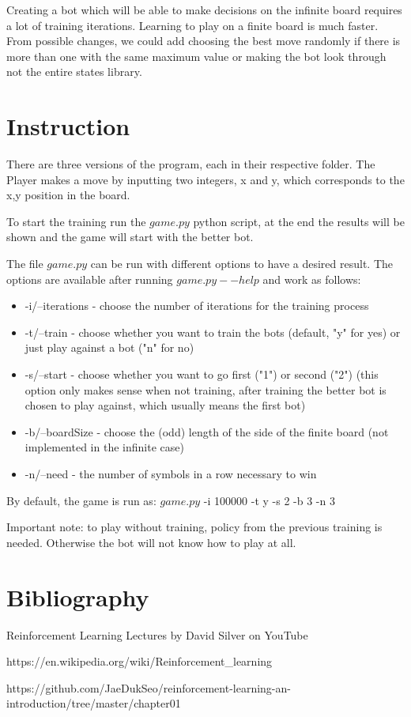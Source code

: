 \documentclass[a4paper,12pt]{book}
\begin{document}
Creating a bot which will be able to make decisions on the infinite board requires a lot of training iterations. Learning to play on a finite board is much faster. From possible changes, we could add choosing the best move randomly if there is more than one with the same maximum value or making the bot look through not the entire states library.

	\chapter{Instruction}

There are three versions of the program, each in their respective folder. The Player makes a move by inputting two integers, x and y, which corresponds to the x,y position in the board.

To start the training run the $game.py$ python script, at the end the results will be shown and the game will start with the better bot.

The file $game.py$ can be run with different options to have a desired result. The options are available after running $game.py --help$ and work as follows:
\begin{itemize}
	\item -i/--iterations - choose the number of iterations for the training process
	\item -t/--train - choose whether you want to train the bots (default, "y" for yes) or just play against a bot ("n" for no)
	\item -s/--start - choose whether you want to go first ("1") or second ("2") (this option only makes sense when not training, after training the better bot is chosen to play against, which usually means the first bot) 
	\item -b/--boardSize - choose the (odd) length of the side of the finite board (not implemented in the infinite case)
	\item -n/--need - the number of symbols in a row necessary to win
\end{itemize}

By default, the game is run as: $game.py$ -i 100000 -t  y -s 2 -b 3 -n 3

Important note: to play without training, policy from the previous training is needed. Otherwise the bot will not know how to play at all.

	\chapter{Bibliography}

\begin{description}
	\item Reinforcement Learning Lectures by David Silver on YouTube
	\item https://en.wikipedia.org/wiki/Reinforcement\_learning
	\item https://github.com/JaeDukSeo/reinforcement-learning-an-introduction/tree/master/chapter01
\end{description}


	\backmatter
	
\end{document}
